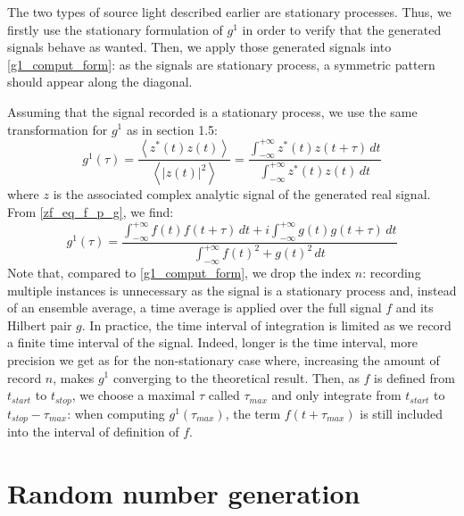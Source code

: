 \documentclass[11pt]{report}
\begin{document}
The two types of source light described earlier are stationary processes. Thus, we firstly use the stationary formulation of $g^1$ in order to verify that the generated signals behave as wanted. Then, we apply those generated signals into \eqref{g1_comput_form}: as the signals are stationary process, a symmetric pattern should appear along the diagonal.

Assuming that the signal recorded is a stationary process, we use the same transformation for $g^1$ as in section 1.5:
\begin{equation}
g^1(\tau) = \frac{\left\langle z^*(t)z(t) \right\rangle}{\left\langle \vert z(t) \vert ^2 \right\rangle} = \frac{\int_{-\infty}^{+\infty} z^*(t)z(t + \tau)\, dt}{\int_{-\infty}^{+\infty} z^*(t)z(t) \, dt}
\end{equation}
where $z$ is the associated complex analytic signal of the generated real signal. From \eqref{zf_eq_f_p_g}, we find:
\begin{equation}
\label{g1_stattionary_computer}
g^1(\tau) = \frac{\int_{-\infty}^{+\infty} f(t)f(t + \tau)\, dt  + i \int_{-\infty}^{+\infty} g(t)g(t + \tau)\, dt}{\int_{-\infty}^{+\infty} f(t)^2 + g(t)^2 \, dt}
\end{equation}
Note that, compared to \eqref{g1_comput_form}, we drop the index $n$: recording multiple instances is unnecessary as the signal is a stationary process and, instead of an ensemble average, a time average is applied over the full signal $f$ and its Hilbert pair $g$. In practice, the time interval of integration is limited as we record a finite time interval of the signal. Indeed, longer is the time interval, more precision we get as for the non-stationary case where, increasing the amount of record $n$, makes $g^1$ converging to the theoretical result. Then, as $f$ is defined from $t_{start}$ to $t_{stop}$, we choose a maximal $\tau$ called $\tau_{max}$ and only integrate from $t_{start}$ to $t_{stop} - \tau_{max}$: when computing $g^1(\tau_{max})$, the term $f(t+\tau_{max})$ is still included into the interval of definition of $f$.

\section{Random number generation}
\end{document}
